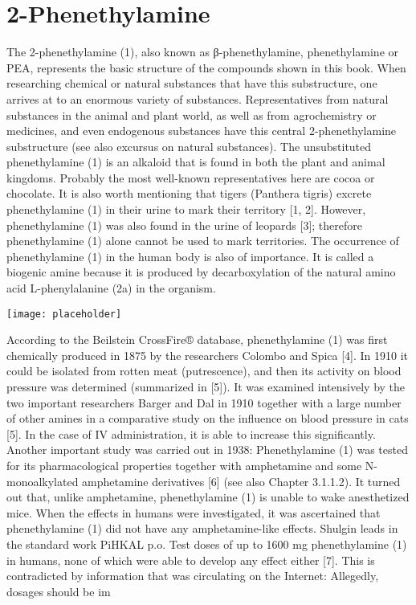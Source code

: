 
\chapter{2-Phenethylamine}

The 2-phenethylamine (1), also known as β-phenethylamine, phenethylamine or PEA, represents the basic structure of the compounds shown in this book. When researching chemical or natural substances that have this substructure, one arrives at
to an enormous variety of substances. Representatives from natural substances in the animal and plant world, as well as from agrochemistry or medicines, and even endogenous substances have this central 2-phenethylamine substructure (see also excursus on natural substances).
The unsubstituted phenethylamine (1) is an alkaloid that is found in both the plant and animal kingdoms. Probably the most well-known representatives here are cocoa or chocolate.
It is also worth mentioning that tigers (Panthera tigris) excrete phenethylamine (1) in their urine to mark their territory [1, 2]. However, phenethylamine (1) was also found in the urine of leopards [3]; therefore phenethylamine (1) alone cannot be used to mark territories. The occurrence of phenethylamine (1) in the human body is also of importance. It is called a biogenic amine because it is produced by decarboxylation of the natural amino acid L-phenylalanine (2a) in the organism.

\texttt{[image: placeholder]}

According to the Beilstein CrossFire® database, phenethylamine (1) was first chemically produced in 1875 by the researchers Colombo and Spica [4]. In 1910 it could be isolated from rotten meat (putrescence), and then its activity on blood pressure was determined (summarized in [5]). It was examined intensively by the two important researchers Barger and Dal in 1910 together with a large number of other amines in a comparative study on the influence on blood pressure in cats [5]. In the case of IV administration, it is able to increase this significantly.
Another important study was carried out in 1938: Phenethylamine (1) was tested for its pharmacological properties together with amphetamine and some N-monoalkylated amphetamine derivatives [6] (see also Chapter 3.1.1.2). It turned out that, unlike amphetamine, phenethylamine (1) is unable to wake anesthetized mice. When the effects in humans were investigated, it was ascertained that phenethylamine (1) did not have any amphetamine-like effects. Shulgin leads in the standard work PiHKAL p.o. Test doses of up to 1600 mg phenethylamine (1) in humans, none of which were able to develop any effect either [7]. This is contradicted by information that was circulating on the Internet: Allegedly, dosages should be im
\clearpage

